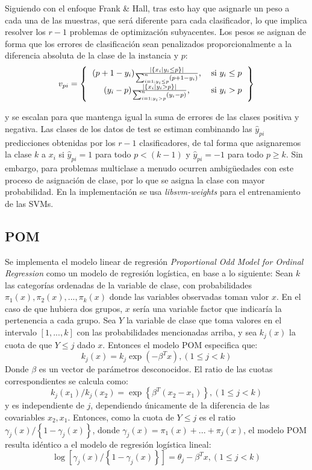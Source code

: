 Siguiendo con el enfoque Frank \& Hall, tras esto hay que asignarle un peso a cada una de las muestras, que será diferente para cada clasificador, lo que implica resolver los $r-1$ problemas de optimización subyacentes. \newline
Los pesos se asignan de forma que los errores de clasificación sean penalizados proporcionalmente a la diferencia absoluta de la clase de la instancia y $p$:
\[ 
v_{pi}=
\left \{
\begin{tabular}{cc}
$(p + 1 -y_i) \frac{| \left\{ x_i | y_i \leq p \right\} |}{\sum_{i=1;y_i \leq p }^{n}(p+1 -y_i)}$, & si $y_i \leq p$ \\
$(y_i -p)\frac{| \left\{ x_i | y_i > p \right\} |}{\sum_{i=1;y_i > p }^{n}(y_i -p)}$, & si $y_i > p$  
\end{tabular}
\right \}
\]

y se escalan para que mantenga igual la suma de errores de las clases positiva y negativa. Las clases de los datos de test se estiman combinando las $\hat{y}_{pi}$ predicciones obtenidas por los $r-1$ clasificadores, de tal forma que asignaremos la clase $k$ a $x_i$ si $\hat{y}_{pi}=1$ para todo $p < (k-1)$ y $\hat{y}_{pi}=-1$ para todo $p \geq k$. Sin embargo, para problemas multiclase a menudo ocurren ambigüedades con este proceso de asignación de clase, por lo que se asigna la clase con mayor probabilidad. En la implementación se usa \textit{libsvm-weights} \cite{chang2011libsvm} para el entrenamiento de las SVMs.
\subsection{POM}
Se implementa el modelo linear de regresión \textit{Proportional Odd Model for Ordinal Regression} \cite{mccullagh1980regression} como un modelo de regresión logística, en base a lo siguiente:\newline
Sean $k$ las categorías ordenadas de la variable de clase, con probabilidades $\pi_1(x),\pi_2(x),...,\pi_k(x)$ donde las variables observadas toman valor $x$. En el caso de que hubiera dos grupos, $x$ sería una variable factor que indicaría la pertenencia a cada grupo. Sea $Y$ la variable de clase que toma valores en el intervalo $\left[1,...,k\right]$ con las probabilidades mencionadas arriba, y sea $k_j(x)$ la cuota de que $Y \leq j$ dado $x$. Entonces el modelo POM especifica que:
$$k_j(x)=k_j \exp (-\beta^T x), (1 \leq j < k)$$ 
Donde $\beta$ es un vector de parámetros desconocidos. El ratio de las cuotas correspondientes se calcula como:
$$k_j(x_1)/k_j(x_2)= \exp \left\{ \beta^T (x_2 - x_1)\right\}, (1 \leq j < k)$$
y es independiente de $j$, dependiendo únicamente de la diferencia de las covariables $x_2,x_1$. Entonces, como la cuota de $Y \leq j$ es el ratio $\gamma_j(x)/ \left\{ 1- \gamma_j(x) \right\}$, donde $\gamma_j(x)=\pi_1(x)+...+\pi_j(x)$, el modelo POM resulta idéntico a el modelo de regresión logística lineal:
$$\log \left[ \gamma_j(x)/ \left\{ 1- \gamma_j(x) \right\} \right] = \theta_j - \beta^T x , (1 \leq j < k)$$

